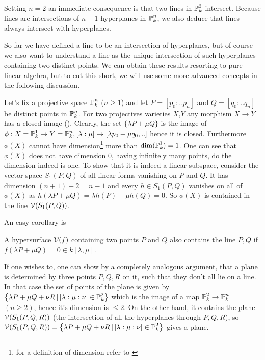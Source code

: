 \begin{corollary} \label{corollarySimpleIntersect}
Setting $n=2$ an immediate consequence is that two lines in $\operatorname{\mathbb P}^2_k$ intersect.
Because lines are intersections of $n-1$ hyperplanes in $\operatorname{\mathbb P}^n_k$, we also deduce that lines always intersect with hyperplanes.
\end{corollary}

So far we have defined a line to be an intersection of hyperplanes, but of course we also want to understand a line as the unique intersection of such hyperplanes containing two distinct points.
We can obtain these results resorting to pure linear algebra, but to cut this short, we will use some more advanced concepts in the following discussion.

Let's fix a projective space $\operatorname{\mathbb P}^n_k$ ($n\geq 1$) and let $P=[p_0:..p_n]$ and $Q=[q_0:..q_n]$ be distinct points in $\operatorname{\mathbb P}^n_k$.
For two projectives varieties $X$,$Y$ any morphism $X \to Y$ has a closed image (\cite[theorem 1.10]{shafarevich1994basic}).
Clearly, the set $\{ \lambda P + \mu Q \}$ is the image of $\phi : X=\operatorname{\mathbb P}^1_k \to Y=\operatorname{\mathbb P}^n_k, [\lambda:\mu] \mapsto [\lambda p_0 + \mu q_0,..]$ hence it is closed.
Furthermore $\phi(X)$ cannot have dimension\footnote{for a definition of dimension refer to \cite[chapter 6]{shafarevich1994basic}} more than $\dim(\operatorname{\mathbb P}^1_k) = 1$.
One can see that $\phi(X)$ does not have dimension 0, having infinitely many points, do the dimension indeed is one.
To show that it is indeed a linear subspace, consider the vector space $S_1(P,Q)$ of all linear forms vanishing on $P$ and $Q$.
It has dimension $(n+1) - 2 = n-1$ and every $h \in S_1(P,Q)$ vanishes on all of $\phi(X)$ as $h(\lambda P + \mu Q) = \lambda h(P) + \mu h(Q) = 0$.
So $\phi(X)$ is contained in the line $\operatorname{\mathcal V}(S_1(P,Q))$.

An easy corollary is
\begin{lemma} \label{lemmaLineOnSurface}
A hypersurface $\operatorname{\mathcal V}(f)$ containing two points $P$ and $Q$ also contains the line $\overline{P,Q}$ if $f(\lambda P +\mu Q) = 0 \in k[\lambda,\mu]$.
\end{lemma}

If one wishes to, one can show by a completely analogous argument, that a plane is determined by three points $P,Q,R$ on it, such that they don't all lie on a line.
In that case the set of points of the plane is given by $\left\lbrace\lambda P + \mu Q + \nu R\,|\, [\lambda:\mu:\nu] \in \operatorname{\mathbb P}^2_k\right\rbrace$ which is the image of a map $\operatorname{\mathbb P}^2_k \to \operatorname{\mathbb P}^n_k$ $(n\geq 2)$, hence it's dimension is $\leq 2$.
On the other hand, it contains the plane $\operatorname{\mathcal V}(S_1(P,Q,R))$ (the intersection of all the hyperplanes through $P,Q,R$), so $\operatorname{\mathcal V}(S_1(P,Q,R)) = \left\lbrace\lambda P + \mu Q + \nu R\,|\, [\lambda:\mu:\nu] \in \operatorname{\mathbb P}^2_k\right\rbrace$ gives a plane.


